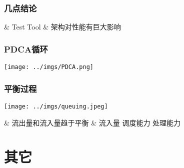 \documentclass[UTF8,8pt,xcolor=dvipsnames]{beamer}
\newenvironment{myeasylist}[1]{
    \Activate
    \begin{tcolorbox}
    \begin{easylist}[#1]
} {
    \end{easylist}
    \end{tcolorbox}
    \Deactivate
}
\begin{document}
\begin{frame}[fragile]
    \frametitle{几点结论}
    \begin{myeasylist}{itemize}
        & Test Tool
        & 架构对性能有巨大影响
    \end{myeasylist}
\end{frame}

\begin{frame}[fragile]
    \frametitle{PDCA循环}
    \begin{center}
        \texttt{[image: ../imgs/PDCA.png]}
    \end{center}
\end{frame}

\begin{frame}[fragile]
    \frametitle{平衡过程}
    \begin{center}
        \texttt{[image: ../imgs/queuing.jpeg]}
    \end{center}

    \begin{myeasylist}{itemize}
        & 流出量和流入量趋于平衡
        & 流入量  调度能力  处理能力
    \end{myeasylist}
\end{frame}

\section{其它}


\end{document}
